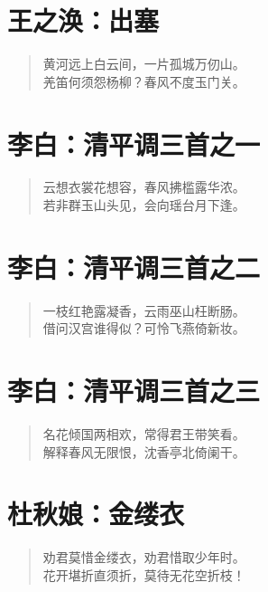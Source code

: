 \documentclass[12pt,oneside]{book}
\newenvironment{shici}{
\begin{verse}
\centering\large\hspace{12pt}}
{\end{verse}}
\begin{document}
\chapter{王之涣：出塞}
\begin{shici}
黄河远上白云间，一片孤城万仞山。\\
羌笛何须怨杨柳？春风不度玉门关。
\end{shici}

\chapter{李白：清平调三首之一}
\begin{shici}
云想衣裳花想容，春风拂槛露华浓。\\
若非群玉山头见，会向瑶台月下逢。
\end{shici}

\chapter{李白：清平调三首之二}
\begin{shici}
一枝红艳露凝香，云雨巫山枉断肠。\\
借问汉宫谁得似？可怜飞燕倚新妆。
\end{shici}

\chapter{李白：清平调三首之三}
\begin{shici}
名花倾国两相欢，常得君王带笑看。\\
解释春风无限恨，沈香亭北倚阑干。
\end{shici}

\chapter{杜秋娘：金缕衣}
\begin{shici}
劝君莫惜金缕衣，劝君惜取少年时。\\
花开堪折直须折，莫待无花空折枝！
\end{shici}


\end{document}
